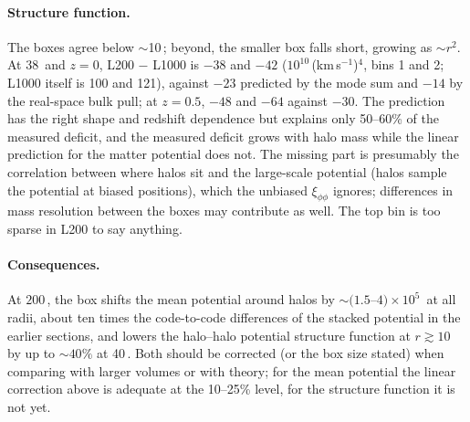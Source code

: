 \paragraph{Structure function.} The boxes agree below $\sim$10\,\Mpch; beyond, the smaller box falls short, growing
as $\sim r^2$. At 38\,\Mpch{} and $z = 0$, L200 $-$ L1000 is $-38$ and $-42$ ($10^{10}$\,(km\,s$^{-1}$)$^4$, bins 1
and 2; L1000 itself is 100 and 121), against $-23$ predicted by the mode sum and $-14$ by the real-space bulk pull;
at $z = 0.5$, $-48$ and $-64$ against $-30$. The prediction has the right shape and redshift dependence but explains
only 50--60\% of the measured deficit, and the measured deficit grows with halo mass while the linear prediction for
the matter potential does not. The missing part is presumably the correlation between where halos sit and the
large-scale potential (halos sample the potential at biased positions), which the unbiased $\xi_{\phi\phi}$ ignores;
differences in mass resolution between the boxes may contribute as well. The top bin is too sparse in L200 to say
anything.

\paragraph{Consequences.} At $200$\,\Mpch, the box shifts the mean potential around halos by $\sim(1.5$--$4)\times
10^5$\,\kms{} at all radii, about ten times the code-to-code differences of the stacked potential in the earlier sections, and lowers the
halo--halo potential structure function at $r\gtrsim10$\,\Mpch{} by up to $\sim40\%$ at 40\,\Mpch. Both should be
corrected (or the box size stated) when comparing with larger volumes or with theory; for the mean potential the
linear correction above is adequate at the 10--25\% level, for the structure function it is not yet.
